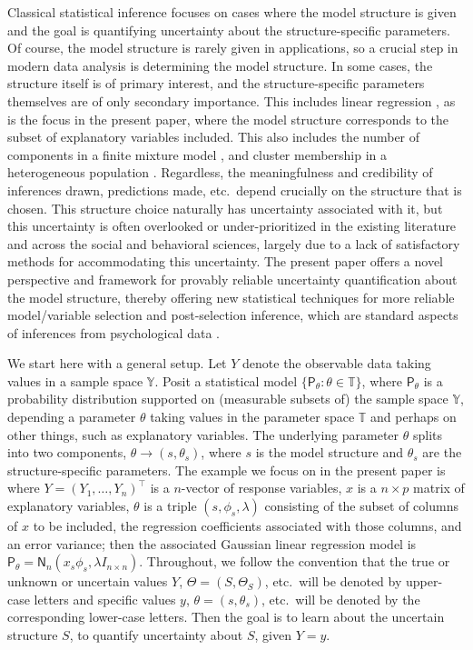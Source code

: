 \documentclass[12pt]{article}
\def\YY{\mathbb{Y}}
\def\TT{\mathbb{T}}
\def\prob{\mathsf{P}}
\begin{document}
Classical statistical inference focuses on cases where the model structure is given and the goal is quantifying uncertainty about the structure-specific parameters.  Of course, the model structure is rarely given in applications, so a crucial step in modern data analysis is determining the model structure.  In some cases, the structure itself is of primary interest, and the structure-specific parameters themselves are of only secondary importance.  This includes linear regression \citep[e.g.][]{lockhart2014significance, hansen.econometrca.2011, buhlmann.geer.book}, as is the focus in the present paper, where the model structure corresponds to the subset of explanatory variables included.  This also includes the number of components in a finite mixture model \citep[e.g.,][]{chen.khalili.2008, mclachlan1987, mclachlanpeel}, 
and cluster membership in a heterogeneous population \citep[e.g.][]{gan.etal.2021, schafer2016mapping, gao.etal.2023}.  Regardless, the meaningfulness and credibility of inferences drawn, predictions made, etc.~depend crucially on the structure that is chosen.  This structure choice naturally has uncertainty associated with it, but this uncertainty is often overlooked or under-prioritized in the existing literature and across the social and behavioral sciences, largely due to a lack of satisfactory methods for accommodating this uncertainty.  The present paper offers a novel perspective and framework for provably reliable uncertainty quantification about the model structure, thereby offering new statistical techniques for more reliable model/variable selection and post-selection inference, which are standard aspects of inferences from psychological data \citep{bergh.etal.2021,claeskens2008}.

We start here with a general setup.  Let $Y$ denote the observable data taking values in a sample space $\YY$.  Posit a statistical model $\{\prob_\theta: \theta \in \TT\}$, where $\prob_\theta$ is a probability distribution supported on (measurable subsets of) the sample space $\YY$, depending a parameter $\theta$ taking values in the parameter space $\TT$ and perhaps on other things, such as explanatory variables.  The underlying parameter $\theta$ splits into two components, $\theta \to (s,\theta_s)$, where $s$ is the model structure and $\theta_s$ are the structure-specific parameters.  The example we focus on in the present paper is where $Y = (Y_1,\ldots,Y_n)^\top$ is a $n$-vector of response variables, $x$ is a $n \times p$ matrix of explanatory variables, $\theta$ is a triple $(s,\phi_s,\lambda)$ consisting of the subset of columns of $x$ to be included, the regression coefficients associated with those columns, and an error variance; then the associated Gaussian linear regression model is $\prob_\theta = \mathsf{N}_n(x_s\phi_s, \lambda I_{n \times n})$. Throughout, we follow the convention that the true or unknown or uncertain values $Y$, $\Theta = (S,\Theta_S)$, etc.~will be denoted by upper-case letters and specific values $y$, $\theta=(s,\theta_s)$, etc.~will be denoted by the corresponding lower-case letters.  Then the goal is to learn about the uncertain structure $S$, to quantify uncertainty about $S$, given $Y=y$.   
\end{document}
